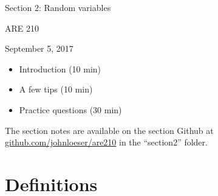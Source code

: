 \documentclass[12pt,english]{article}
\begin{document}
\begin{center}
{\Large{}Section 2: Random variables}
\par\end{center}{\Large \par}

\begin{center}
ARE 210
\par\end{center}

\begin{center}
September 5, 2017
\par\end{center}

\begin{itemize}
	\item Introduction (10 min)
	\item A few tips (10 min)
	\item Practice questions (30 min)
\end{itemize}
The section notes are available on the section Github at \href{github.com/johnloeser/are210}{github.com/johnloeser/are210} in the ``section2'' folder.

\section{Definitions}
\end{document}
